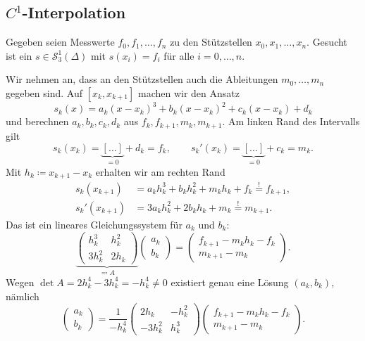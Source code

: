\documentclass[11pt]{article}
\begin{document}
\subsection{\texorpdfstring{$C^1$}{C1}-Interpolation}

Gegeben seien Messwerte $f_0, f_1, \dots, f_n$ zu den Stützstellen $x_0, x_1, \dots, x_n$.
Gesucht ist ein $s \in \mathcal{S}_3^1(\Delta)$ mit $s(x_i) = f_i$ für alle $i = 0, \dots, n$.

Wir nehmen an, dass an den Stützstellen auch die Ableitungen $m_0, \dots, m_n$ gegeben sind.
Auf $[x_k, x_{k+1}]$ machen wir den Ansatz
\[ s_k(x) = a_k (x - x_k)^3 + b_k (x - x_k)^2 + c_k (x - x_k) + d_k \]
und berechnen $a_k, b_k, c_k, d_k$ aus $f_k, f_{k+1}, m_k, m_{k+1}$.
Am linken Rand des Intervalls gilt
\[ s_k(x_k) = \underbrace{[\dots]}_{= 0} + d_k = f_k, \qquad s_k'(x_k) = \underbrace{[\dots]}_{= 0} + c_k = m_k. \]
Mit $h_k \coloneqq x_{k+1} - x_k$ erhalten wir am rechten Rand
\begin{align*}
  s_k(x_{k+1}) &= a_k h_k^3 + b_k h_k^2 + m_k h_k + f_k \overset{!}{=} f_{k+1}, \\
  s_k'(x_{k+1}) &= 3 a_k h_k^2 + 2 b_k h_k + m_k \overset{!}{=} m_{k+1}.
\end{align*}
Das ist ein lineares Gleichungssystem für $a_k$ und $b_k$:
\begin{equation}
  \underbrace{\begin{pmatrix} h_k^3 & h_k^2 \\ 3 h_k^2 & 2 h_k \end{pmatrix}}_{\eqqcolon A}
  \begin{pmatrix} a_k \\ b_k \end{pmatrix}
  = \begin{pmatrix} f_{k+1} - m_k h_k - f_k \\ m_{k+1} - m_k \end{pmatrix}.
  \tag{$\ast$}
\end{equation}
Wegen $\det A = 2 h_k^4 - 3 h_k^4 = -h_k^4 \neq 0$ existiert genau eine Lösung $(a_k, b_k)$, nämlich
\[
  \begin{pmatrix} a_k \\ b_k \end{pmatrix}
  = \frac{1}{-h_k^4} \begin{pmatrix} 2 h_k & -h_k^2 \\ -3 h_k^2 & h_k^3 \end{pmatrix}
  \begin{pmatrix} f_{k+1} - m_k h_k - f_k \\ m_{k+1} - m_k \end{pmatrix}.
\]
\end{document}
